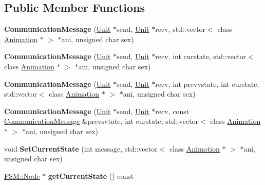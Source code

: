 \subsection*{Public Member Functions}
\begin{DoxyCompactItemize}
\item 
{\bfseries Communication\+Message} (\hyperlink{classUnit}{Unit} $\ast$send, \hyperlink{classUnit}{Unit} $\ast$recv, std\+::vector$<$ class \hyperlink{classAnimation}{Animation} $\ast$ $>$ $\ast$ani, unsigned char sex)\hypertarget{classCommunicationMessage_a19377df4495b104bf27516462988a81f}{}\label{classCommunicationMessage_a19377df4495b104bf27516462988a81f}

\item 
{\bfseries Communication\+Message} (\hyperlink{classUnit}{Unit} $\ast$send, \hyperlink{classUnit}{Unit} $\ast$recv, int curstate, std\+::vector$<$ class \hyperlink{classAnimation}{Animation} $\ast$ $>$ $\ast$ani, unsigned char sex)\hypertarget{classCommunicationMessage_a0afaddb94380d42de2aba2602ecabd8c}{}\label{classCommunicationMessage_a0afaddb94380d42de2aba2602ecabd8c}

\item 
{\bfseries Communication\+Message} (\hyperlink{classUnit}{Unit} $\ast$send, \hyperlink{classUnit}{Unit} $\ast$recv, int prevvstate, int curstate, std\+::vector$<$ class \hyperlink{classAnimation}{Animation} $\ast$ $>$ $\ast$ani, unsigned char sex)\hypertarget{classCommunicationMessage_aee71de049dc669c6c425c39ba419e4f1}{}\label{classCommunicationMessage_aee71de049dc669c6c425c39ba419e4f1}

\item 
{\bfseries Communication\+Message} (\hyperlink{classUnit}{Unit} $\ast$send, \hyperlink{classUnit}{Unit} $\ast$recv, const \hyperlink{classCommunicationMessage}{Communication\+Message} \&prevsvtate, int curstate, std\+::vector$<$ class \hyperlink{classAnimation}{Animation} $\ast$ $>$ $\ast$ani, unsigned char sex)\hypertarget{classCommunicationMessage_a56e127c09f5a24e8ca999a426746bf38}{}\label{classCommunicationMessage_a56e127c09f5a24e8ca999a426746bf38}

\item 
void {\bfseries Set\+Current\+State} (int message, std\+::vector$<$ class \hyperlink{classAnimation}{Animation} $\ast$ $>$ $\ast$ani, unsigned char sex)\hypertarget{classCommunicationMessage_a1fdfe36707cec53a6c9ead95803b6658}{}\label{classCommunicationMessage_a1fdfe36707cec53a6c9ead95803b6658}

\item 
\hyperlink{structFSM_1_1Node}{F\+S\+M\+::\+Node} $\ast$ {\bfseries get\+Current\+State} () const \hypertarget{classCommunicationMessage_ae9a92e1aa492ad43fa403ef86d602e04}{}\label{classCommunicationMessage_ae9a92e1aa492ad43fa403ef86d602e04}


\end{DoxyCompactItemize}
